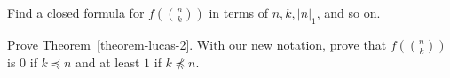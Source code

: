 
\begin{exercise}
   Find a closed formula for $f\left({n \choose k}\right)$ in terms of $n, k, |n|_1$, and so on.
\end{exercise}


\begin{exercise}
 Prove Theorem~\ref{theorem-lucas-2}. With our new notation, prove that
 $f\left( {n \choose k}\right)$ is $0$ if $k \preceq n$ and at least $1$ if 
 $k \not \preceq n$.
\end{exercise}

